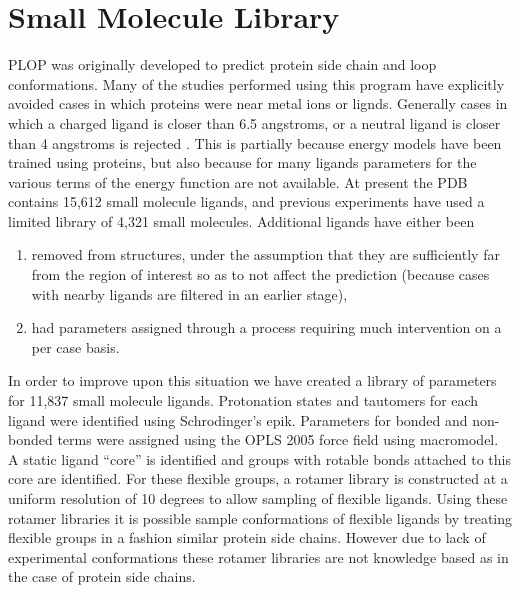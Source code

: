 \section{Small Molecule Library}
\label{section:unsorted/small_molecule_library}
PLOP was originally developed to predict protein side chain and loop conformations.
Many of the studies performed using this program have explicitly avoided cases in which proteins were near metal ions or lignds.
Generally cases in which a charged ligand is closer than 6.5 angstroms, or a neutral ligand is closer than 4 angstroms is rejected \cite{goldfeld2011successful,miller2013prediction}.
This is partially because energy models have been trained using proteins, but also because for many ligands parameters for the various terms of the energy function are not available.
At present the PDB contains 15,612 small molecule ligands, and previous experiments have used a limited library of 4,321 small molecules.
Additional ligands have either been
\begin{enumerate}
\item removed from structures, under the assumption that they are sufficiently far from the region of interest so as to not affect the prediction (because cases with nearby ligands are filtered in an earlier stage),
\item had parameters assigned through a process requiring much intervention on a per case basis.
\end{enumerate}

In order to improve upon this situation we have created a library of parameters for 11,837 small molecule ligands.
Protonation states and tautomers for each ligand were identified using Schrodinger's epik.
Parameters for bonded and non-bonded terms were assigned using the OPLS 2005 force field using macromodel.
A static ligand ``core'' is identified and groups with rotable bonds attached to this core are identified.
For these flexible groups, a rotamer library is constructed at a uniform resolution of 10 degrees to allow sampling of flexible ligands.
Using these rotamer libraries it is possible sample conformations of flexible ligands by treating flexible groups in a fashion similar protein side chains.
However due to lack of experimental conformations these rotamer libraries are not knowledge based as in the case of protein side chains.

